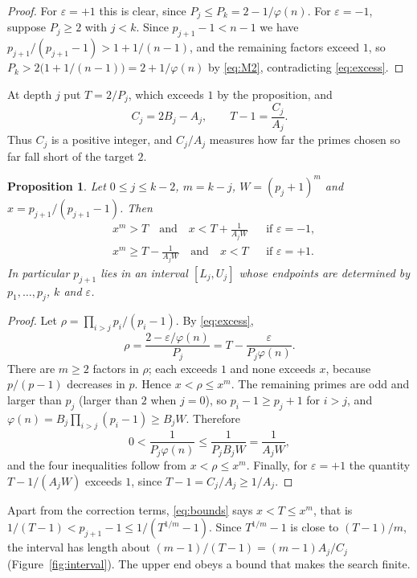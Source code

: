 \documentclass[screen,reqno]{aomart}
\numberwithin{equation}{section}
\theoremstyle{plain}
\newtheorem{proposition}[theorem]{Proposition}
\theoremstyle{definition}
\theoremstyle{remark}
\begin{document}
\begin{proof}
For $\varepsilon=+1$ this is clear, since $P_j\le P_k=2-1/\varphi(n)$.
For $\varepsilon=-1$, suppose $P_j\ge2$ with $j<k$. Since
$p_{j+1}-1<n-1$ we have $p_{j+1}/(p_{j+1}-1)>1+1/(n-1)$, and the
remaining factors exceed $1$, so
$P_k>2\bigl(1+1/(n-1)\bigr)=2+1/\varphi(n)$ by \eqref{eq:M2},
contradicting \eqref{eq:excess}.
\end{proof}

At depth $j$ put $T=2/P_j$, which exceeds $1$ by the proposition, and
\[
  C_j=2B_j-A_j,\qquad T-1=\frac{C_j}{A_j}.
\]
Thus $C_j$ is a positive integer, and $C_j/A_j$ measures how far the
primes chosen so far fall short of the target $2$.

\begin{proposition}\label{prop:bounds}
Let $0\le j\le k-2$, $m=k-j$, $W=(p_j+1)^m$ and
$x=p_{j+1}/(p_{j+1}-1)$. Then
\begin{equation}\label{eq:bounds}
\begin{aligned}
  &x^m>T \quad\text{and}\quad x<T+\frac{1}{A_jW} &&\text{if }\varepsilon=-1,\\
  &x^m\ge T-\frac{1}{A_jW}\quad\text{and}\quad x<T &&\text{if }\varepsilon=+1 .
\end{aligned}
\end{equation}
In particular $p_{j+1}$ lies in an interval $[L_j,U_j]$ whose
endpoints are determined by $p_1,\dots,p_j$, $k$ and $\varepsilon$.
\end{proposition}

\begin{proof}
Let $\rho=\prod_{i>j}p_i/(p_i-1)$. By \eqref{eq:excess},
\[
  \rho=\frac{2-\varepsilon/\varphi(n)}{P_j}
  =T-\frac{\varepsilon}{P_j\varphi(n)} .
\]
There are $m\ge2$ factors in $\rho$; each exceeds $1$ and none exceeds
$x$, because $p/(p-1)$ decreases in $p$. Hence $x<\rho\le x^m$. The
remaining primes are odd and larger than $p_j$ (larger than $2$ when
$j=0$), so $p_i-1\ge p_j+1$ for $i>j$, and
$\varphi(n)=B_j\prod_{i>j}(p_i-1)\ge B_jW$. Therefore
\[
  0<\frac{1}{P_j\varphi(n)}\le\frac{1}{P_jB_jW}=\frac1{A_jW},
\]
and the four inequalities follow from $x<\rho\le x^m$. Finally, for
$\varepsilon=+1$ the quantity $T-1/(A_jW)$ exceeds $1$, since
$T-1=C_j/A_j\ge1/A_j$.
\end{proof}

Apart from the correction terms, \eqref{eq:bounds} says $x<T\le x^m$,
that is $1/(T-1)<p_{j+1}-1\le1/(T^{1/m}-1)$. Since
$T^{1/m}-1$ is close to $(T-1)/m$, the interval has length about
$(m-1)/(T-1)=(m-1)A_j/C_j$ (Figure~\ref{fig:interval}). The upper end
obeys a bound that makes the search finite.
\end{document}
